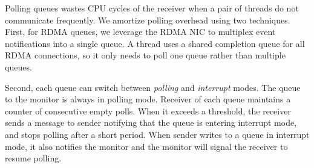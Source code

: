 Polling queues wastes CPU cycles of the receiver when a pair of threads do not communicate frequently. We amortize polling overhead using two techniques.
First, for RDMA queues, we leverage the RDMA NIC to multiplex event notifications into a single queue.
A thread uses a shared completion queue for all RDMA connections, so it only needs to poll one queue rather than multiple queues.

Second, each queue can switch between \textit{polling} and \textit{interrupt} modes. The queue to the monitor is always in polling mode. Receiver of each queue maintains a counter of consecutive empty polls. When it exceeds a threshold, the receiver sends a message to sender notifying that the queue is entering interrupt mode, and stops polling after a short period. When sender writes to a queue in interrupt mode, it also notifies the monitor and the monitor will signal the receiver to resume polling.
